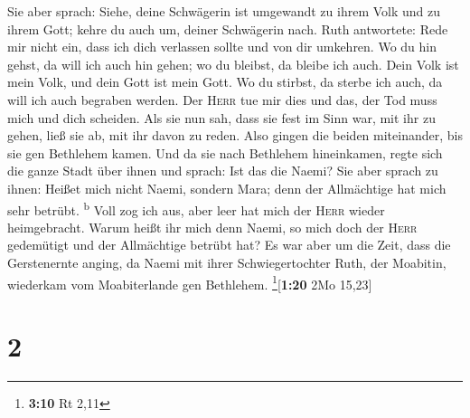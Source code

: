  Sie aber sprach: Siehe, deine Schwägerin ist umgewandt
zu ihrem Volk und zu ihrem Gott; kehre du auch um, deiner Schwägerin
nach.  Ruth antwortete: Rede mir nicht ein, dass ich dich
verlassen sollte und von dir umkehren. Wo du hin gehst, da will ich auch
hin gehen; wo du bleibst, da bleibe ich auch. Dein Volk ist mein Volk,
und dein Gott ist mein Gott.  Wo du stirbst, da sterbe
ich auch, da will ich auch begraben werden. Der \textsc{Herr} tue mir
dies und das, der Tod muss mich und dich scheiden.  Als
sie nun sah, dass sie fest im Sinn war, mit ihr zu gehen, ließ sie ab,
mit ihr davon zu reden.  Also gingen die beiden
miteinander, bis sie gen Bethlehem kamen. Und da sie nach Bethlehem
hineinkamen, regte sich die ganze Stadt über ihnen und sprach: Ist das
die Naemi?  Sie aber sprach zu ihnen: Heißet mich nicht
Naemi, sondern Mara; denn der Allmächtige hat mich sehr betrübt.
\textsuperscript{b}  Voll zog ich aus, aber leer hat mich
der \textsc{Herr} wieder heimgebracht. Warum heißt ihr mich denn Naemi,
so mich doch der \textsc{Herr} gedemütigt und der Allmächtige betrübt
hat?  Es war aber um die Zeit, dass die Gerstenernte
anging, da Naemi mit ihrer Schwiegertochter Ruth, der Moabitin,
wiederkam vom Moabiterlande gen Bethlehem. \footnote{\textbf{3:10} Rt
  2,11}{[}\textbf{1:20} 2Mo 15,23{]}

\hypertarget{section-1}{%
\section{2}\label{section-1}}

